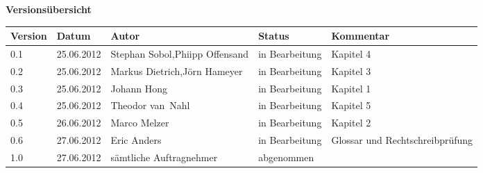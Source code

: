 
{\textbf{Versionsübersicht}}\\[2ex]

\begin{longtable}{|m{1.78cm}|m{1.59cm}|m{3.5cm}|m{2.1cm}|m{3.0cm}|}

  \hline                                              %

  \textbf{Version}  &    \textbf{Datum}  &    \textbf{Autor}  &
  \textbf{Status}   &    \textbf{Kommentar}       \\  %
  \hline                                              %


  0.1    &    25.06.2012    &    Stephan Sobol,\newline Phiipp \mbox{Offensand}    &    
  in Bearbeitung    &  Kapitel 4   \\      %
  \hline                                                     %
  0.2    &    25.06.2012    &    Markus Dietrich,\newline Jörn Hameyer    &    
  in Bearbeitung    &    Kapitel 3\\      %
  \hline                            %
  0.3    &    25.06.2012    &    Johann Hong    &    
  in Bearbeitung    &    Kapitel 1\\      %
  \hline                                                     %
  0.4    &    25.06.2012    &    Theodor \mbox{van Nahl}    &    
  in Bearbeitung    &    Kapitel 5\\      %
  \hline                                                     %
  0.5    &    26.06.2012    &    Marco Melzer    &    
  in Bearbeitung    &    Kapitel 2\\      %
  \hline                                                     %
  0.6    &    27.06.2012    &    Eric Anders    &    
  in Bearbeitung    &    Glossar und Rechtschreibprüfung\\      %
  \hline                                                     %
  1.0    &    27.06.2012    &    sämtliche Auftragnehmer    &    
  abgenommen    &    \\      %
  \hline                                                     %
  
  

\end{longtable}

